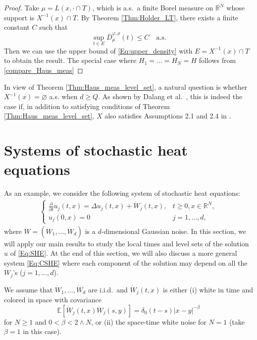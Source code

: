 \documentclass[11pt, reqno]{amsart}
\def\R{{\mathbb R}}
\def\E{{\mathbb E}}
\numberwithin{equation}{section}
\begin{document}
\begin{proof}
Take $\mu = L(x, \cdot \cap T)$, which is a.s.~a finite Borel measure on $\R^N$ whose support is $X^{-1}(x) \cap T$. 
By Theorem \ref{Thm:Holder_LT}, there exists a finite constant $C$ such that 
\[ \sup_{t \in E}\overline{D}^{\varphi, \rho}_\mu(t) \le C \quad \text{a.s.} \]
Then we can use the upper bound of \eqref{Eq:upper_density} with $E = X^{-1}(x) \cap T$ to obtain the result. 
The special case where $H_1 = \dots = H_N = H$ follows from \eqref{compare_Haus_meas}
\end{proof}

\smallskip

In view of Theorem \ref{Thm:Haus_meas_level_set}, a natural question is whether  $X^{-1}(x) =\varnothing $ a.s. 
when $d \ge Q$.  As shown by Dalang et al.~\cite[Theorem 2.6]{DMX17}, this is indeed the case if, in addition to satisfying 
conditions of Theorem \ref{Thm:Haus_meas_level_set}, $X$ also satisfies Assumptions 2.1 and 2.4 in \cite{DMX17}.  



\section{Systems of stochastic heat equations}
\label{sect:SHE}

As an example, we consider the following system of stochastic heat equations:
\begin{align}\label{Eq:SHE}
\begin{cases}
\displaystyle\frac{\partial}{\partial t} u_j(t, x) = \Delta u_j(t, x) + \dot{W}_j(t, x), & t \ge 0, x \in \R^N,\\
u_j(0, x) = 0 & j = 1, \dots, d,
\end{cases}
\end{align}
where $\dot{W} = (\dot{W}_1, \dots, \dot{W}_d)$ is a $d$-dimensional Gaussian noise. 
In this section, we will apply our main results to study the local times and level sets of the solution $u$ of \eqref{Eq:SHE}. 
At the end of this section, we will also discuss a more general system \eqref{Eq:CSHE} where each component 
of the solution may depend on all the $\dot{W}_j$'s ($j = 1, \dots, d$).


We assume that $\dot{W}_1, \dots, \dot{W}_d$ are i.i.d.~and $\dot{W}_j(t, x)$ is either 
(i) white in time and colored in space with covariance
\[ \E[\dot{W}_j(t, x) \dot{W}_j(s, y)] = \delta_0(t-s) |x-y|^{-\beta} \]
for $N \ge 1$ and $0 < \beta < 2 \wedge N$, or (ii) the space-time white noise for $N = 1$ (take $\beta=1$ in this case).
\end{document}

